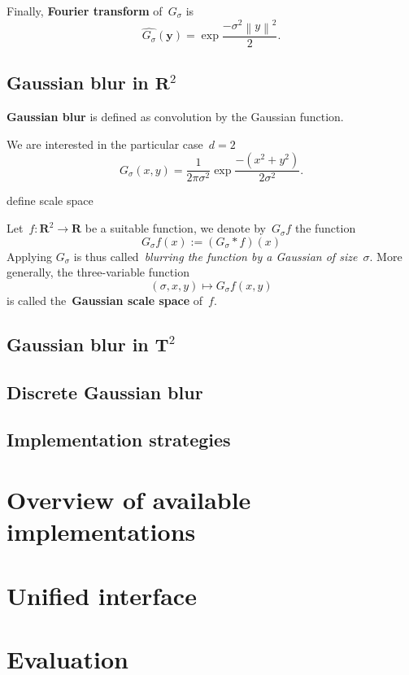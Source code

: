 \documentclass[a4paper,twoside,11pt]{article}    %
\theoremstyle{note}
\theoremstyle{plain}
\newcommand{\1}{\mathbf{1}}
\newcommand{\R}{\mathbf{R}}
\newcommand{\T}{\mathbf{T}}
\newcommand{\y}{\mathbf{y}}
\newcommand{\Abs}[1]{\left\|#1\right\|}
\newcommand{\parens}[1]{\left(#1\right)}
\begin{document}
Finally, {\bf Fourier transform} of~$G_\sigma$ is
\[
	\widehat{G_\sigma}(\y)=\exp\frac{-\sigma^2\Abs{y}^2}2.
\]

\subsection{Gaussian blur in $\R^2$}

{\bf Gaussian blur} is defined as convolution by the Gaussian function.  

We are interested in the particular case~$d=2$
\[
	G_{\sigma}(x,y)=\frac1{2\pi\sigma^2}\exp\frac{-(x^2+y^2)}{2\sigma^2}.
\]

define scale space

Let~$f:\R^2\to\R$ be a suitable function, we denote by~$G_\sigma f$ the
function
\[
	G_\sigma f (x) := \parens{G_\sigma * f}(x)
\]
Applying $G_\sigma$ is thus called~\emph{blurring the function by a Gaussian
of size~$\sigma$}.  More generally, the three-variable function
\[
	(\sigma,x,y)\mapsto G_\sigma f(x,y)
\]
is called the~{\bf Gaussian scale space} of~$f$.


\subsection{Gaussian blur in $\T^2$}

\subsection{Discrete Gaussian blur}

\subsection{Implementation strategies}



\section{Overview of available implementations}



\section{Unified interface}



\section{Evaluation}
\end{document}
